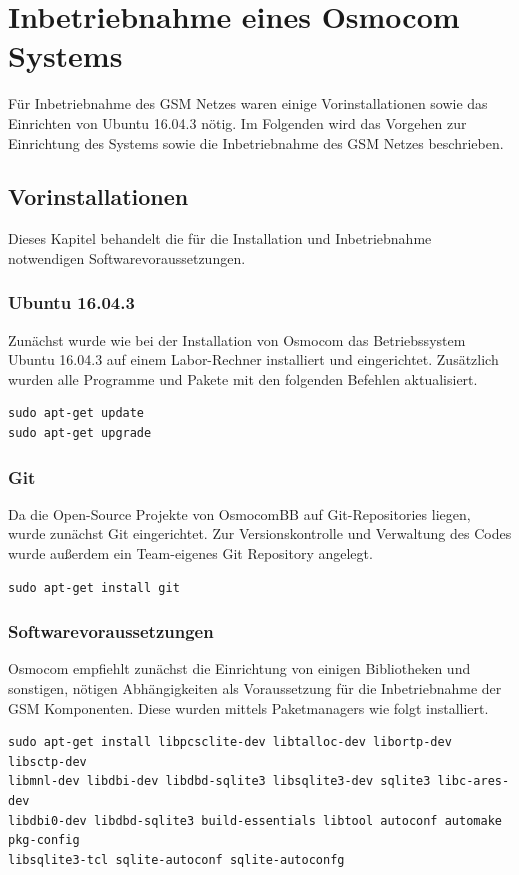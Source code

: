 
\section{Inbetriebnahme eines Osmocom Systems}
Für Inbetriebnahme des GSM Netzes waren einige Vorinstallationen sowie das Einrichten von Ubuntu 16.04.3 nötig. Im Folgenden wird das Vorgehen zur Einrichtung des Systems sowie die Inbetriebnahme des GSM Netzes beschrieben.

\subsection{Vorinstallationen}
Dieses Kapitel behandelt die für die Installation und Inbetriebnahme notwendigen Softwarevoraussetzungen.

\subsubsection{Ubuntu 16.04.3}\label{ubuntu}
Zunächst wurde wie bei der Installation von Osmocom das Betriebssystem Ubuntu 16.04.3 auf einem Labor-Rechner installiert und eingerichtet. Zusätzlich wurden alle Programme und Pakete mit den folgenden Befehlen aktualisiert.
\begin{lstlisting}
sudo apt-get update
sudo apt-get upgrade
\end{lstlisting}
\subsubsection{Git}
Da die Open-Source Projekte von OsmocomBB auf Git-Repositories liegen, wurde zunächst Git eingerichtet. Zur Versionskontrolle und Verwaltung des Codes wurde außerdem ein Team-eigenes Git Repository angelegt.

\begin{lstlisting}
sudo apt-get install git
\end{lstlisting}

\subsubsection{Softwarevoraussetzungen}
Osmocom empfiehlt zunächst die Einrichtung von einigen Bibliotheken und sonstigen, nötigen Abhängigkeiten als Voraussetzung für die Inbetriebnahme der GSM Komponenten. Diese wurden mittels Paketmanagers wie folgt installiert.

\begin{lstlisting}
sudo apt-get install libpcsclite-dev libtalloc-dev libortp-dev libsctp-dev 
libmnl-dev libdbi-dev libdbd-sqlite3 libsqlite3-dev sqlite3 libc-ares-dev 
libdbi0-dev libdbd-sqlite3 build-essentials libtool autoconf automake pkg-config 
libsqlite3-tcl sqlite-autoconf sqlite-autoconfg
\end{lstlisting}

